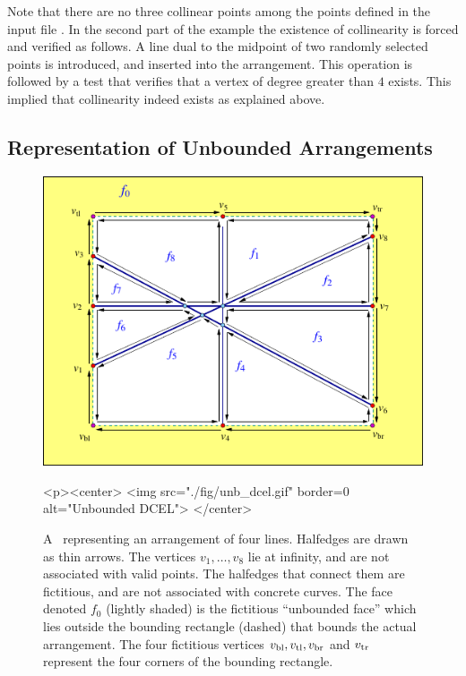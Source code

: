 
Note that there are no three collinear points among the points defined
in the input file . In the second part of the example
the existence of collinearity is forced and verified as follows. A line
dual to the midpoint of two randomly selected points is introduced,
and inserted into the arrangement. This operation is followed by a
test that verifies that a vertex of degree greater than $4$
exists. This implied that collinearity indeed exists as explained above.

\begin{ccAdvanced}

\subsection{Representation of Unbounded Arrangements\label{arr_ssec:unb_rep}}

\begin{figure}[t]
\begin{ccTexOnly}
  \begin{center}
  \includegraphics{Arrangement_on_surface_2/fig/unb_dcel}
  \end{center}
\end{ccTexOnly}
\begin{ccHtmlOnly}
  <p><center>
  <img src="./fig/unb_dcel.gif" border=0 alt="Unbounded DCEL">
  </center>
\end{ccHtmlOnly}
\caption{A \dcel\ representing an arrangement of four lines.
Halfedges are drawn as thin arrows. The vertices $v_1, \ldots, v_8$
lie at infinity, and are not associated with valid points. The
halfedges that connect them are fictitious, and are not associated
with concrete curves. The face denoted $f_0$ (lightly shaded)
is the fictitious ``unbounded face'' which lies outside the bounding
rectangle (dashed) that bounds the actual arrangement. The four
fictitious vertices $v_{\rm bl}, v_{\rm tl}, v_{\rm br}$ and
$v_{\rm tr}$ represent the four corners of the bounding
rectangle.\label{arr_fig:unb_dcel}}
\end{figure}


\end{ccAdvanced}
